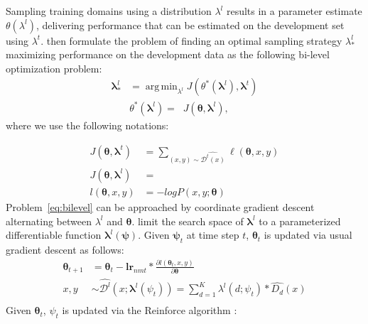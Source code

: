 \documentclass[11pt,a4paper]{article}
\newcommand{\fyTodo}[1]{\Todo[FY:]{\textcolor{orange}{#1}}}
\newcommand{\vlambda}{\ensuremath{\boldsymbol\lambda}\xspace} %
\newcommand{\vtheta}{\ensuremath{\boldsymbol\theta}\xspace} %
\newcommand{\vpsi}{\ensuremath{\boldsymbol\psi}\xspace} %
\DeclareMathOperator*{\argmin}{arg\,min}
\begin{document}
Sampling training domains using a distribution $\lambda^{l}$ results in a parameter estimate $\theta(\lambda^{l})$, delivering performance that can be estimated on the development set using $\lambda^{t}$. \citet{Wang20optimizing,Wang20balancing} then formulate the problem of finding an optimal sampling strategy $\lambda^{l}_{*}$ maximizing performance on the development data as the following bi-level optimization problem:
\begin{equation} \label{eq:bilevel}
\begin{split}
\vlambda^{l}_* &= \displaystyle{\mathop{\argmin}_{\lambda^{l}} J(\theta^*(\vlambda^{l}), \vlambda^{t})} \\
					& \theta^*(\vlambda^{l}) = \displaystyle{\mathop{\argmin_{\vtheta}} J(\vtheta, \vlambda^{l})}, 
\end{split}
\end{equation}
where we use the following notations:%

\begin{align*}
J(\vtheta, \vlambda^{t} ) &= \displaystyle{\mathop{\sum}_{(x,y) \sim \widehat{\mathcal{D}^{t}(x)}} \ell(\vtheta,x,y)} \\
J(\vtheta, \vlambda^{l}) &= \displaystyle{\mathop{E_{(x,y) \sim \widehat{\mathcal{D}^{l}(x)}}[\ell(\vtheta,x,y)]}} \\
l(\vtheta,x,y) &= - log P(x,y;\vtheta)
\end{align*}
Problem~\eqref{eq:bilevel} can be approached by coordinate gradient descent alternating between $\lambda^{l}$ and $\vtheta$. \citet{Wang20balancing} limit the search space of $\vlambda^{l}$ to a parameterized differentiable function $\vlambda^{l}(\vpsi)$. Given $\vpsi_t$ at time step $t$, $\vtheta_t$ is updated via usual gradient descent as follows:
\begin{align*}
\vtheta_{t+1} &= \vtheta_t - \mathbf{lr}_{nmt} * \frac{\partial l(\vtheta_t, x,y)}{\partial \vtheta} \\
x,y &\sim \widehat{\mathcal{D}^l}(x;\vlambda^l(\psi_t)) = \displaystyle{\mathop{\sum}_{d=1}^K} \lambda^l(d;\psi_t) * \widehat{D_d}(x) \\
\end{align*}
Given $\vtheta_t$, $\psi_t$ is updated via the Reinforce algorithm \cite{Williams92simple}:\fyTodo{Rewrite this correctly with domain average reward}
\end{document}
